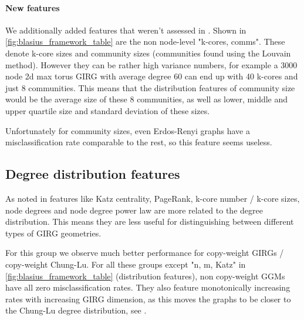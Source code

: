 \paragraph{New features}
We additionally added features that weren't assessed in \cite{blasius2018towards}. Shown in \cref{fig:blasius_framework_table} are the non node-level  "k-cores, comms". These denote k-core sizes and community sizes (communities found using the Louvain method).
However they can be rather high variance numbers, for example a 3000 node 2d max torus GIRG with average degree 60 can end up with 40 k-cores and just 8 communities. This means that the distribution features of community size would be the average size of these 8 communities, as well as lower, middle and upper quartile size and standard deviation of these sizes.

Unfortunately for community sizes, even Erdos-Renyi graphs have a misclassification rate comparable to the rest, so this feature seems useless.



\subsection{Degree distribution features}
As noted in \cite{blasius2018towards} features like Katz centrality, PageRank, k-core number / k-core sizes, node degrees and node degree power law are more related to the degree distribution. This means they are less useful for distinguishing between different types of GIRG geometries.

For this group we observe much better performance for copy-weight GIRGs / copy-weight Chung-Lu. For all these groups except "n, m, Katz" in \cref{fig:blasius_framework_table} (distribution features), non copy-weight GGMs have all zero misclassification rates. They also feature monotonically increasing rates with increasing GIRG dimension, as this moves the graphs to be closer to the Chung-Lu degree distribution, see \cite{friedrich2023cliques}.


